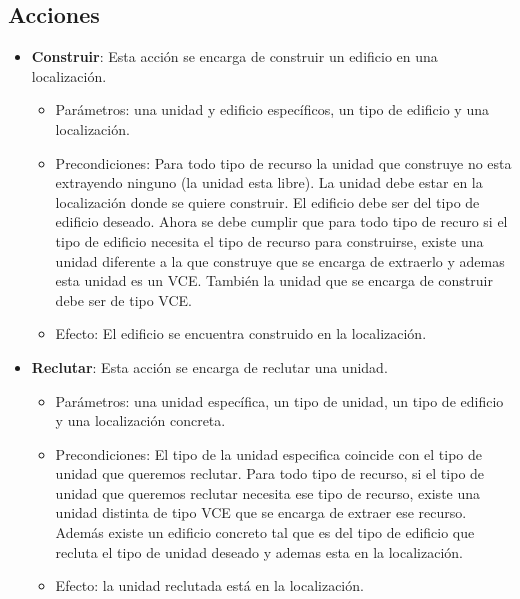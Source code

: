 \subsection{Acciones}
\begin{itemize}
   \item \textbf{Construir}: Esta acción se encarga de construir un edificio en una localización.
   \begin{itemize}
      \item Parámetros: una unidad y edificio específicos, un tipo de edificio y una localización.
      \item Precondiciones: Para todo tipo de recurso la unidad que construye no esta extrayendo ninguno (la unidad esta libre). La unidad debe estar en la localización donde se quiere construir. El edificio debe ser del tipo de edificio deseado. Ahora se debe cumplir que para todo tipo de recuro si el tipo de edificio necesita el tipo de recurso para construirse, existe una unidad diferente a la que construye que se encarga de extraerlo y ademas esta unidad es un VCE. También la unidad que se encarga de construir debe ser de tipo VCE.
      \item Efecto: El edificio se encuentra construido en la localización.
   \end{itemize}
   \item \textbf{Reclutar}: Esta acción se encarga de reclutar una unidad.
   \begin{itemize}
      \item Parámetros: una unidad específica, un tipo de unidad, un tipo de edificio y una localización concreta.
      \item Precondiciones: El tipo de la unidad especifica coincide con el tipo de unidad que queremos reclutar. Para todo tipo de recurso, si el tipo de unidad que queremos reclutar necesita ese tipo de recurso, existe una unidad distinta de tipo VCE que se encarga de extraer ese recurso. Además existe un edificio concreto tal que es del tipo de edificio que recluta el tipo de unidad deseado y ademas esta en la localización.
      \item Efecto: la unidad reclutada está en la localización.
   \end{itemize}
\end{itemize}
